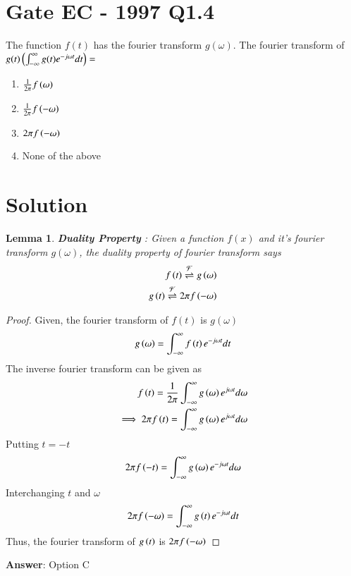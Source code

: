 \documentclass[journal,12pt,twocolumn]{IEEEtran}
\newtheorem{lemma}[theorem]{Lemma}
\begin{document}
\section*{Gate EC - 1997 Q1.4}
The function $f(t)$ has the fourier transform $g(\omega)$. The fourier transform of $g(t) \left( \int_{-\infty}^{\infty} g(t) e^{-j\omega t} dt\right) = $
\begin{enumerate}[label=\Alph*)]
    \item $\frac{1}{2\pi}f\left(\omega\right)$
    \item $\frac{1}{2\pi}f\left(-\omega\right)$
    \item $2\pi f\left(-\omega\right)$
    \item None of the above
\end{enumerate}
\section*{Solution}
\begin{lemma}
\textbf{Duality Property} : Given a function $f(x)$ and it's fourier transform $g(\omega)$, the duality property of fourier transform says
\begin{align}
    f\left(t\right) \overset{\mathcal{F}}{ \rightleftharpoons}{g} \left(\omega\right)\\
    g\left(t\right) \overset{\mathcal{F}}{ \rightleftharpoons}2\pi{f} \left(-\omega\right)
\end{align}
\end{lemma}
\begin{proof}
Given, the fourier transform of $f(t)$ is $g(\omega)$
\begin{align}
    g\left(\omega\right) = \int_{-\infty}^{\infty} f\left(t\right) e^{-j\omega t} dt
\end{align}
The inverse fourier transform can be given as
\begin{align}
    f\left(t\right) = \frac{1}{2\pi} \int_{-\infty}^{\infty} g\left(\omega\right) e^{j\omega t} d\omega\\
    \implies 2\pi f\left(t\right) = \int_{-\infty}^{\infty} g\left(\omega\right) e^{j\omega t} d\omega
\end{align}
Putting $t = -t$
\begin{align}
    2\pi f\left(-t\right) = \int_{-\infty}^{\infty} g\left(\omega\right) e^{-j\omega t} d\omega
\end{align}
Interchanging $t$ and $\omega$
\begin{align}
    2\pi f\left(-\omega\right) = \int_{-\infty}^{\infty} g\left(t\right) e^{-j\omega t} dt
\end{align}
Thus, the fourier transform of $g\left(t\right)$ is $2\pi f\left(-\omega\right)$
\end{proof}
\textbf{Answer}: Option C
\end{document}
